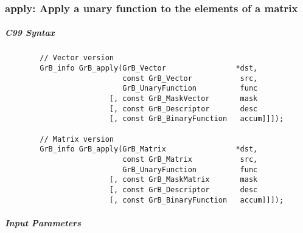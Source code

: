 \subsubsection{{\sf apply}: Apply a unary function to the elements of a matrix}


\subparagraph{C99 Syntax}

\begin{verbatim}
        // Vector version
        GrB_info GrB_apply(GrB_Vector                *dst,
                           const GrB_Vector           src,
                           GrB_UnaryFunction          func
                        [, const GrB_MaskVector       mask
                        [, const GrB_Descriptor       desc
                        [, const GrB_BinaryFunction   accum]]]);

        // Matrix version
        GrB_info GrB_apply(GrB_Matrix                *dst,
                           const GrB_Matrix           src,
                           GrB_UnaryFunction          func
                        [, const GrB_MaskMatrix       mask
                        [, const GrB_Descriptor       desc
                        [, const GrB_BinaryFunction   accum]]]);
\end{verbatim}

\subparagraph{Input Parameters}

